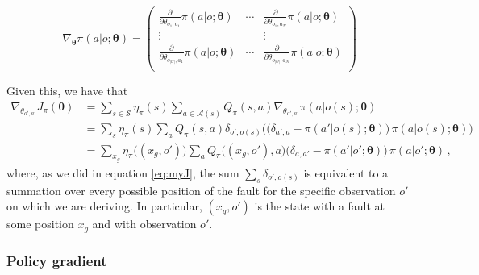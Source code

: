 \begin{equation}
    \nabla_{\boldsymbol \theta} \pi(a|o; \boldsymbol \theta) = \begin{pmatrix}
        \frac{\partial}{\partial \theta_{o_1,a_1}} \pi ( a | o; \boldsymbol \theta )
            & \cdots & \frac{\partial}{\partial \theta_{o_1,a_N}} \pi ( a | o; \boldsymbol \theta ) \\
        \vdots & &
        \vdots \\
        \frac{\partial}{\partial \theta_{o_{|\mathcal O|},a_1}} \pi ( a | o; \boldsymbol \theta ) 
            & \cdots & \frac{\partial}{\partial \theta_{o_{|\mathcal O|},a_N}} \pi ( a | o; \boldsymbol \theta ) \\
    \end{pmatrix}
\end{equation}

Given this, we have that
\begin{equation}
    \begin{aligned}
        \nabla_{\theta_{o',a'}} J_\pi (\boldsymbol \theta)
        &= \sum_{s \in \mathcal S} \eta_\pi(s) \sum_{a \in \mathcal A(s)} Q_\pi(s,a) \nabla_{\theta_{o',a'}} \pi(a|o(s); \boldsymbol \theta) \\
        &= \sum_s \eta_\pi(s) \sum_a Q_\pi(s,a) \delta_{o',o(s)} \Big( \big( \delta_{a',a} - \pi(a'|o(s); \boldsymbol \theta) \big) \, \pi(a|o(s); \boldsymbol \theta) \Big) \\
        &= \sum_{x_g} \eta_\pi \big((x_g, o') \big) \sum_a Q_\pi \big((x_g, o'),a \big) \big( \delta_{a,a'} - \pi(a'|o'; \boldsymbol \theta) \big) \, \pi(a|o'; \boldsymbol \theta) \, ,
    \end{aligned}
    \label{eq:mygradJ}
\end{equation}
where, as we did in equation \eqref{eq:myJ}, the sum $\sum_s \delta_{o', o(s)}$ is equivalent to a summation over every possible position of the fault for the specific observation $o'$ on which we are deriving. In particular, $(x_g, o')$ is the state with a fault at some position $x_g$ and with observation $o'$.


\subsubsection{Policy gradient}

